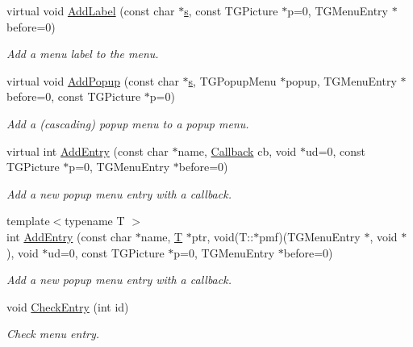\begin{DoxyCompactItemize}
virtual void \hyperlink{class_d_d4hep_1_1_popup_menu_ab142c9486f37c01153674a6749d392dd}{AddLabel} (const char $\ast$\hyperlink{_volumes_8cpp_a17ca6bfc8040d695d3cada22a4763d40}{s}, const TGPicture $\ast$p=0, TGMenuEntry $\ast$before=0)
\begin{DoxyCompactList}\small\item\em Add a menu label to the menu. \item\end{DoxyCompactList}\item 
virtual void \hyperlink{class_d_d4hep_1_1_popup_menu_a8c29cafca2fe99eb2f561ed130616b7f}{AddPopup} (const char $\ast$\hyperlink{_volumes_8cpp_a17ca6bfc8040d695d3cada22a4763d40}{s}, TGPopupMenu $\ast$popup, TGMenuEntry $\ast$before=0, const TGPicture $\ast$p=0)
\begin{DoxyCompactList}\small\item\em Add a (cascading) popup menu to a popup menu. \item\end{DoxyCompactList}\item 
virtual int \hyperlink{class_d_d4hep_1_1_popup_menu_a31d232887f2d18d1437836641cdf9c62}{AddEntry} (const char $\ast$name, \hyperlink{class_d_d4hep_1_1_callback}{Callback} cb, void $\ast$ud=0, const TGPicture $\ast$p=0, TGMenuEntry $\ast$before=0)
\begin{DoxyCompactList}\small\item\em Add a new popup menu entry with a callback. \item\end{DoxyCompactList}\item 
{\footnotesize template$<$typename T $>$ }\\int \hyperlink{class_d_d4hep_1_1_popup_menu_a3baedc1473212377a1045b5b71345df4}{AddEntry} (const char $\ast$name, \hyperlink{class_t}{T} $\ast$ptr, void(T::$\ast$pmf)(TGMenuEntry $\ast$, void $\ast$), void $\ast$ud=0, const TGPicture $\ast$p=0, TGMenuEntry $\ast$before=0)
\begin{DoxyCompactList}\small\item\em Add a new popup menu entry with a callback. \item\end{DoxyCompactList}\item 
void \hyperlink{class_d_d4hep_1_1_popup_menu_aacbb6570c064253d647ef4129a0bc7c8}{CheckEntry} (int id)
\begin{DoxyCompactList}\small\item\em Check menu entry. \item\end{DoxyCompactList}\item 

\end{DoxyCompactItemize}
